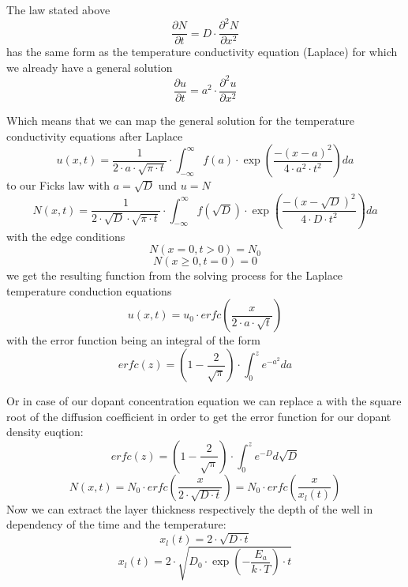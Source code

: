 The law stated above
\begin{equation}
\frac{\partial N}{\partial t} = D \cdot \frac{\partial^2 N}{\partial x^2} 
\end{equation}
has the same form as the temperature conductivity equation (Laplace) for which we already have a general solution
\begin{equation}
\frac{\partial u}{\partial t} = a^2 \cdot \frac{\partial^2 u}{\partial x^2} 
\end{equation}

Which means that we can map the general solution for the temperature conductivity equations after Laplace
\begin{equation}
u(x,t) = \frac{1}{2 \cdot a \cdot \sqrt{\pi \cdot t}} \cdot \int_{-\infty}^{\infty}{f(a)\cdot\exp\left(\frac{-(x-a)^2}{4 \cdot a^2 \cdot t^2}\right)}da
\end{equation}
to our Ficks law with $a=\sqrt{D}$ und $u=N$
\begin{equation}
N(x,t) = \frac{1}{2 \cdot \sqrt{D} \cdot \sqrt{\pi \cdot t}} \cdot \int_{-\infty}^{\infty}{f(\sqrt{D})\cdot\exp\left(\frac{-(x-\sqrt{D})^2}{4 \cdot D \cdot t^2}\right)}da
\end{equation}
with the edge conditions
\begin{equation}
N( x=0 , t > 0 ) = N_0
\end{equation}
\begin{equation}
N( x \geq 0 ,  t = 0 ) = 0
\end{equation}
we get the resulting function from the solving process for the Laplace temperature conduction equations
\begin{equation}
u(x,t)=u_0 \cdot erfc\left(\frac{x}{2 \cdot a \cdot \sqrt{t}}\right)
\end{equation}
with the error function being an integral of the form
\begin{equation}
erfc(z)
=
\left(1-\frac{2}{\sqrt{\pi}}\right)\cdot\int_0^z{e^{-a^2}}da
\end{equation}

Or in case of our dopant concentration equation we can replace a with the square root of the diffusion coefficient in order to get the error function for our dopant density euqtion:
\begin{equation}
erfc(z)
=
\left(1-\frac{2}{\sqrt{\pi}}\right)\cdot\int_0^z{e^{-D}}d\sqrt{D}
\end{equation}
\begin{equation}
N(x,t)
=
N_0 \cdot erfc\left(\frac{x}{2 \cdot \sqrt{D \cdot t}}\right)
=
N_0 \cdot erfc\left(\frac{x}{x_l(t)}\right)
\end{equation}
Now we can extract the layer thickness respectively the depth of the well in dependency of the time and the temperature:
\begin{equation}
x_l(t) = 2 \cdot \sqrt{D \cdot t}
\end{equation}
\begin{equation}
x_l(t) = 2 \cdot \sqrt{D_0 \cdot \exp\left(-\frac{E_a}{k \cdot T}\right) \cdot t}
\end{equation}

